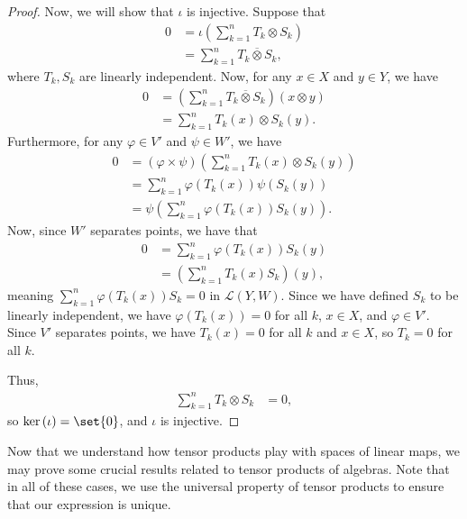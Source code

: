 \begin{proof}
  Now, we will show that $\iota$ is injective. Suppose that
  \begin{align*}
    0 &= \iota\left( \sum_{k=1}^{n}T_k\otimes S_k \right)\\
      &= \sum_{k=1}^{n}T_k\overline{\otimes}S_k,
  \end{align*}
  where $T_k,S_k$ are linearly independent. Now, for any $x\in X$ and $y\in Y$, we have
  \begin{align*}
    0 &= \left( \sum_{k=1}^{n}T_k\overline{\otimes}S_k \right)\left( x\otimes y \right)\\
      &= \sum_{k=1}^{n}T_k\left( x \right)\otimes S_k\left( y \right).
  \end{align*}
  Furthermore, for any $\varphi\in V'$ and $\psi\in W'$, we have
  \begin{align*}
    0 &= \left( \varphi\times \psi \right)\left( \sum_{k=1}^{n}T_k\left( x \right)\otimes S_k\left( y \right) \right)\\
      &= \sum_{k=1}^{n}\varphi\left( T_k\left( x \right) \right)\psi\left( S_k\left( y \right) \right)\\
      &= \psi\left( \sum_{k=1}^{n}\varphi\left( T_k\left( x \right) \right)S_k\left( y \right) \right).
  \end{align*}
  Now, since $W'$ separates points, we have that
  \begin{align*}
    0 &= \sum_{k=1}^{n}\varphi\left( T_k\left( x \right) \right)S_k\left( y \right)\\
      &= \left( \sum_{k=1}^{n} T_k\left( x \right)S_k\right)\left( y \right),
  \end{align*}
  meaning $\displaystyle\sum_{k=1}^{n}\varphi\left( T_k\left( x \right) \right)S_k = 0$ in $\mathcal{L}\left( Y,W \right)$. Since we have defined $S_k$ to be linearly independent, we have $\varphi\left( T_k\left( x \right) \right) = 0$ for all $k$, $x\in X$, and $\varphi\in V'$. Since $V'$ separates points, we have $T_k(x) = 0$ for all $k$ and $x\in X$, so $T_k = 0$ for all $k$.\newline

  Thus, 
  \begin{align*}
    \sum_{k=1}^{n}T_k\otimes S_k &= 0,
  \end{align*}
  so $\ker\left( \iota \right) = \set{0}$, and $\iota$ is injective.
\end{proof}
Now that we understand how tensor products play with spaces of linear maps, we may prove some crucial results related to tensor products of algebras. Note that in all of these cases, we use the universal property of tensor products to ensure that our expression is unique.
